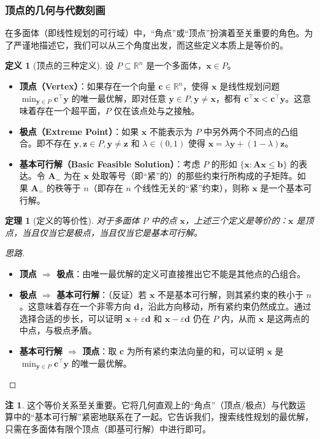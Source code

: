 \documentclass[12pt]{article}
\theoremstyle{plain}
\newtheorem{thm}{定理}[subsection]
\theoremstyle{definition}
\newtheorem{dfn}{定义}[subsection]
\newtheorem{rmk}{注}[subsection]
\newenvironment{prf}[1][证明]{\begin{proof}[#1]}{\end{proof}}
\begin{document}
\subsubsection{顶点的几何与代数刻画}\label{subsubsec:vertex_def}

在多面体（即线性规划的可行域）中，“角点”或“顶点”扮演着至关重要的角色。为了严谨地描述它，我们可以从三个角度出发，而这些定义本质上是等价的。

\begin{dfn}[顶点的三种定义]
    设 $P \subseteq \mathbb{R}^n$ 是一个多面体，$\bm{x} \in P$。
    \begin{itemize}
        \item \textbf{顶点（Vertex）}：如果存在一个向量 $\bm{c} \in \mathbb{R}^n$，使得 $\bm{x}$ 是线性规划问题 $\min_{\bm{y} \in P} \bm{c}^\top \bm{y}$ 的唯一最优解，即对任意 $\bm{y} \in P, \bm{y} \neq \bm{x}$，都有 $\bm{c}^\top \bm{x} < \bm{c}^\top \bm{y}$。这意味着存在一个超平面，$P$ 仅在该点处与之接触。
        \item \textbf{极点（Extreme Point）}：如果 $\bm{x}$ 不能表示为 $P$ 中另外两个不同点的凸组合。即不存在 $\bm{y}, \bm{z} \in P, \bm{y} \neq \bm{z}$ 和 $\lambda \in (0,1)$ 使得 $\bm{x} = \lambda \bm{y} + (1-\lambda)\bm{z}$。
        \item \textbf{基本可行解（Basic Feasible Solution）}：考虑 $P$ 的形如 $\{\bm{x}: \bm{A}\bm{x} \le \bm{b}\}$ 的表达。令 $\bm{A}_=$ 为在 $\bm{x}$ 处取等号（即“紧”的）的那些约束行所构成的子矩阵。如果 $\bm{A}_=$ 的秩等于 $n$（即存在 $n$ 个线性无关的“紧”约束），则称 $\bm{x}$ 是一个基本可行解。
    \end{itemize}
\end{dfn}

\begin{thm}[定义的等价性]
    对于多面体 $P$ 中的点 $\bm{x}$，上述三个定义是等价的：$\bm{x}$ 是顶点，当且仅当它是极点，当且仅当它是基本可行解。
\end{thm}
\begin{prf}[思路]
    \begin{itemize}
        \item \textbf{顶点 $\Rightarrow$ 极点}：由唯一最优解的定义可直接推出它不能是其他点的凸组合。
        \item \textbf{极点 $\Rightarrow$ 基本可行解}：（反证）若 $\bm{x}$ 不是基本可行解，则其紧约束的秩小于 $n$。这意味着存在一个非零方向 $\bm{d}$，沿此方向移动，所有紧约束仍然成立。通过选择合适的步长，可以证明 $\bm{x}+\varepsilon \bm{d}$ 和 $\bm{x}-\varepsilon \bm{d}$ 仍在 $P$ 内，从而 $\bm{x}$ 是这两点的中点，与极点矛盾。
        \item \textbf{基本可行解 $\Rightarrow$ 顶点}：取 $\bm{c}$ 为所有紧约束法向量的和，可以证明 $\bm{x}$ 是 $\min_{\bm{y} \in P} \bm{c}^\top \bm{y}$ 的唯一最优解。
    \end{itemize}
\end{prf}
\begin{rmk}
    这个等价关系至关重要。它将几何直观上的“角点”（顶点/极点）与代数运算中的“基本可行解”紧密地联系在了一起。它告诉我们，搜索线性规划的最优解，只需在多面体有限个顶点（即基可行解）中进行即可。
\end{rmk}
\end{document}
